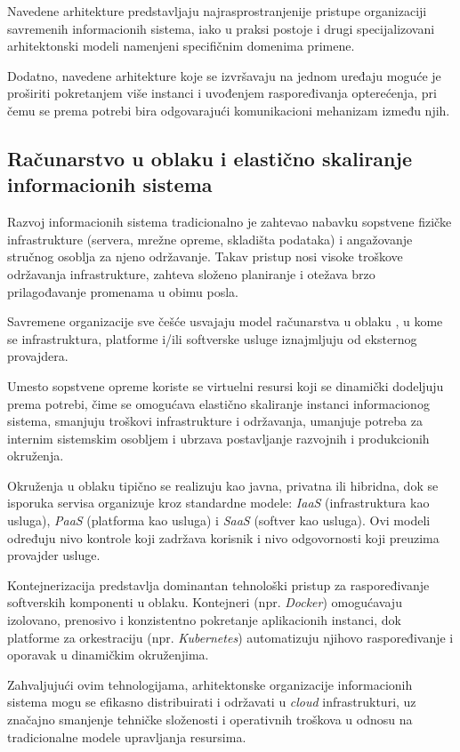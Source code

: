 Navedene arhitekture predstavljaju najrasprostranjenije pristupe organizaciji savremenih informacionih sistema, iako u praksi postoje i drugi specijalizovani arhitektonski modeli namenjeni specifičnim domenima primene.

Dodatno, navedene arhitekture koje se izvršavaju na jednom uređaju moguće je proširiti pokretanjem više instanci i uvođenjem raspoređivanja opterećenja, pri čemu se prema potrebi bira odgovarajući komunikacioni mehanizam između njih.

\subsection{Računarstvo u oblaku i elastično skaliranje informacionih sistema}\label{sec:cloud}
Razvoj informacionih sistema tradicionalno je zahtevao nabavku sopstvene fizičke infrastrukture (servera, mrežne opreme, skladišta podataka) i angažovanje stručnog osoblja za njeno održavanje. Takav pristup nosi visoke troškove održavanja infrastrukture, zahteva složeno planiranje i otežava brzo prilagođavanje promenama u obimu posla.

Savremene organizacije sve češće usvajaju model računarstva u oblaku  \cite{mell2011nist}, u kome se infrastruktura, platforme i/ili softverske usluge iznajmljuju od eksternog provajdera.

Umesto sopstvene opreme koriste se virtuelni resursi koji se dinamički dodeljuju prema potrebi, čime se omogućava elastično skaliranje instanci informacionog sistema, smanjuju troškovi infrastrukture i održavanja, umanjuje potreba za internim sistemskim osobljem i ubrzava postavljanje razvojnih i produkcionih okruženja.

Okruženja u oblaku tipično se realizuju kao javna, privatna ili hibridna, dok se isporuka servisa organizuje kroz standardne modele: \textit{IaaS} (infrastruktura kao usluga), \textit{PaaS} (platforma kao usluga) i \textit{SaaS} (softver kao usluga). Ovi modeli određuju nivo kontrole koji zadržava korisnik i nivo odgovornosti koji preuzima provajder usluge.

Kontejnerizacija predstavlja dominantan tehnološki pristup za raspoređivanje softverskih komponenti u oblaku. Kontejneri (npr. \textit{Docker}) omogućavaju izolovano, prenosivo i konzistentno pokretanje aplikacionih instanci, dok platforme za orkestraciju (npr. \textit{Kubernetes}) automatizuju njihovo raspoređivanje i oporavak u dinamičkim okruženjima.

Zahvaljujući ovim tehnologijama, arhitektonske organizacije informacionih sistema mogu se efikasno distribuirati i održavati u \textit{cloud} infrastrukturi, uz značajno smanjenje tehničke složenosti i operativnih troškova u odnosu na tradicionalne modele upravljanja resursima.

